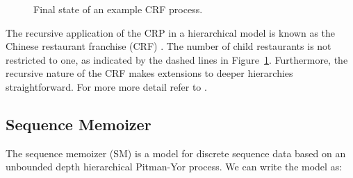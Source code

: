 \begin{figure}[t] 
	\begin{center}
		\caption{Final state of an example CRF process.}
		\label{figHPY}
	\end{center} 
\end{figure} 


The recursive application of the CRP in a hierarchical model is known as the Chinese restaurant franchise (CRF) \cite{Teh2006b}.  The number of child restaurants is not restricted to one, as indicated by the dashed lines in Figure~\ref{figHPY}.  Furthermore, the recursive nature of the CRF makes extensions to deeper hierarchies straightforward. For more more detail refer to \cite{Teh2006b, Teh2006a}.

\subsection{Sequence Memoizer}
\label{sec:sm}

The sequence memoizer (SM) \cite{Wood2009} is a model for discrete sequence data based on an unbounded depth hierarchical Pitman-Yor process. We can write the model as:

